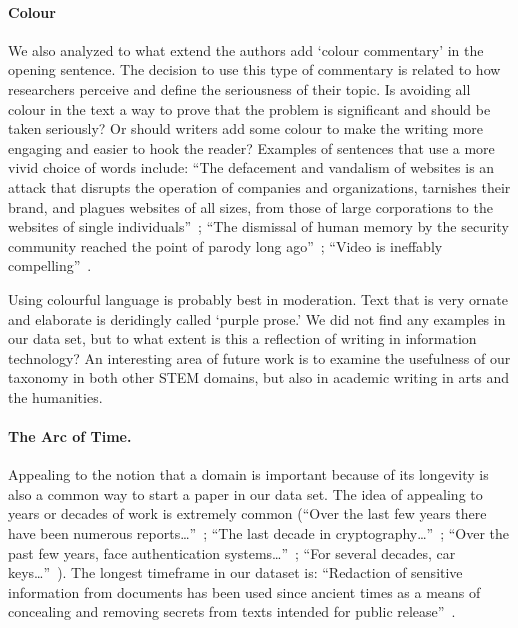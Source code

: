 \documentclass[sigconf]{acmart}
\begin{document}
	\paragraph{Colour} We also analyzed to what extend the authors add `colour commentary' in the opening sentence. The decision to use this type of commentary is related to how researchers perceive and define the seriousness of their topic. Is avoiding all colour in the text a way to prove that the problem is significant and should be taken seriously? Or should writers add some colour to make the writing more engaging and easier to hook the reader? Examples of sentences that use a more vivid choice of words include: ``The defacement and vandalism of websites is an attack that disrupts the operation of companies and organizations, tarnishes their brand, and plagues websites of all sizes, from those of large corporations to the websites of single individuals''~\cite{borgolte2015meerkat}; ``The dismissal of human memory by the security community reached the point of parody long ago''~\cite{bonneau2014towards}; ``Video is ineffably compelling''~\cite{brocker2014iseeyou}.

	Using colourful language is probably best in moderation. Text that is very ornate and elaborate is deridingly called `purple prose.' We did not find any examples in our data set, but to what extent is this a reflection of writing in information technology? An interesting area of future work is to examine the usefulness of our taxonomy in both other STEM domains, but also in academic writing in arts and the humanities.

	\paragraph{The Arc of Time.} Appealing to the notion that a domain is important because of its longevity is also a common way to start a paper in our data set. The idea of appealing to years or decades of work is extremely common (``Over the last few years there have been numerous reports…''~\cite{nakibly2016website}; ``The last decade in cryptography…''~\cite{alkim2016post}; ``Over the past few years, face authentication systems…''~\cite{xu2016virtual}; ``For several decades, car keys…''~\cite{garcia2016lock}). The longest timeframe in our dataset is: ``Redaction of sensitive information from documents has been used since ancient times as a means of concealing and removing secrets from texts intended for public release''~\cite{araujo2015compiler}.
\end{document}
